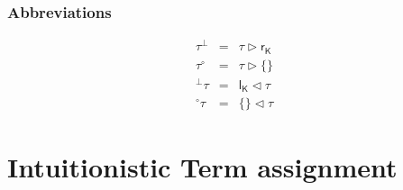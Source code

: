 \documentclass{llncs}
\renewcommand{\:}{\colon}
\begin{document}
\subsubsection{Abbreviations}
\begin{eqnarray*}
  \tau^{\perp} & = & \tau \rhd \mathsf{r}_{\mathsf{K}} \\
  \tau^{\circ} & = & \tau \rhd \{\} \\
  ^{\perp}\tau & = & \mathsf{l}_{\mathsf{K}} \lhd \tau \\
  ^{\circ}\tau & = & \{\} \lhd \tau
\end{eqnarray*}

\section{Intuitionistic Term assignment}

\begin{table}[htp]
  \caption{Wiring operations}
\end{table}
\end{document}
